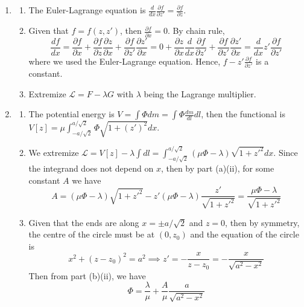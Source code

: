 \documentclass[a4paper]{article}
\begin{document}
\begin{ans}\leavevmode
\begin{enumerate}[label=(\alph*)]
\item
\begin{enumerate}[label=(\roman*)]
\item  The Euler-Lagrange equation is $\frac{d}{dx}\frac{\partial f}{\partial z'}=\frac{\partial f}{\partial z}$.
\item Given that $f=f(z,z')$, then $\frac{\partial f}{\partial x}=0$. By chain rule,
$$\frac{df}{dx}=\frac{\partial f}{\partial x}+\frac{\partial f}{\partial z}\frac{\partial z}{\partial x}+\frac{\partial f}{\partial z'}\frac{\partial z'}{\partial x}=0+\frac{\partial z}{\partial x}\frac{d}{dx}\frac{\partial f}{\partial z'}+\frac{\partial f}{\partial z'}\frac{\partial z'}{\partial x}=\frac{d}{dx}z'\frac{\partial f}{\partial z'}$$
where we used the Euler-Lagrange equation. Hence, $f-z'\frac{\partial f}{\partial z'}$ is a constant.
\item Extremize $\mathcal{L}=F-\lambda G$ with $\lambda$ being the Lagrange multiplier.
\end{enumerate}
\item
\begin{enumerate}[label=(\roman*)]
\item
The potential energy is $V=\int\Phi dm=\int\Phi\frac{dm}{dl}dl$, then the functional is 
$V[z]=\mu\int_{-a/\sqrt{2}}^{a/\sqrt{2}}\Phi\sqrt{1+(z')^2}dx$.
\item We extremize $\mathcal{L}=V[z]-\lambda\int dl=\int_{-a/\sqrt{2}}^{a/\sqrt{2}}(\mu\Phi-\lambda)\sqrt{1+z'^2}dx$. 
Since the integrand does not depend on $x$, then by part (a)(ii), for some constant $A$ we have
$$A=(\mu\Phi-\lambda)\sqrt{1+z'^2}-z'(\mu\Phi-\lambda)\frac{z'}{\sqrt{1+z'^2}}=\frac{\mu\Phi-\lambda}{\sqrt{1+z'^2}}$$
\item Given that the ends are along $x=\pm a/\sqrt{2}$ and $z=0$, then by symmetry, the centre of the circle must be at $(0,z_0)$ and the equation of the circle is
$$x^2+(z-z_0)^2=a^2\implies z'=-\frac{x}{z-z_0}=-\frac{x}{\sqrt{a^2-x^2}}$$
Then from part (b)(ii), we have
$$\Phi=\frac{\lambda}{\mu}+\frac{A}{\mu}\frac{a}{\sqrt{a^2-x^2}}$$
\end{enumerate}
\end{enumerate}
\end{ans}
\newpage
\end{document}
